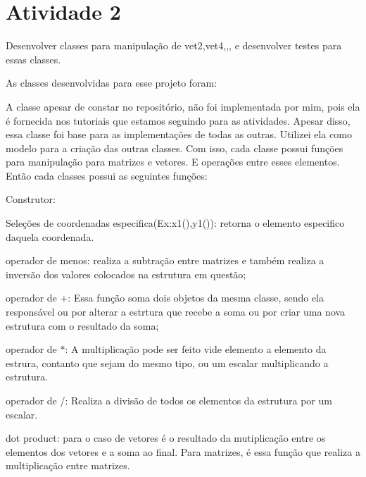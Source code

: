 \chapter{Atividade 2}
\hypertarget{md_README}{}\label{md_README}
\label{md_README_autotoc_md0}%
%
 Desenvolver classes para manipulação de vet2,vet4,,, e desenvolver testes para essas classes.

As classes desenvolvidas para esse projeto foram\+:


\begin{DoxyItemize}
\item {}
\item {}
\item {}
\item {}
\item {}
\end{DoxyItemize}

A classe  apesar de constar no repositório, não foi implementada por mim, pois ela é fornecida nos tutoriais que estamos seguindo para as atividades. Apesar disso, essa classe foi base para as implementações de todas as outras. Utilizei ela como modelo para a criação das outras classes. Com isso, cada classe possui funções para manipulação para matrizes e vetores. E operações entre esses elementos. Então cada classes possui as seguintes funções\+:


\begin{DoxyItemize}
\item Construtor\+:
\item Seleções de coordenadas especifica(Ex\+:x1(),y1())\+: retorna o elemento especifico daquela coordenada.
\item operador de menos\+: realiza a subtração entre matrizes e também realiza a inversão dos valores colocados na estrutura em questão;
\item operador de +\+: Essa função soma dois objetos da mesma classe, sendo ela responsável ou por alterar a estrtura que recebe a soma ou por criar uma nova estrutura com o resultado da soma;
\item operador de \texorpdfstring{$\ast$}{*}\+: A multiplicação pode ser feito vide elemento a elemento da estrura, contanto que sejam do mesmo tipo, ou um escalar multiplicando a estrutura.
\item operador de /\+: Realiza a divisão de todos os elementos da estrutura por um escalar.
\item dot product\+: para o caso de vetores é o resultado da mutiplicação entre os elementos dos vetores e a soma ao final. Para matrizes, é essa função que realiza a multiplicação entre matrizes.
\end{DoxyItemize}

